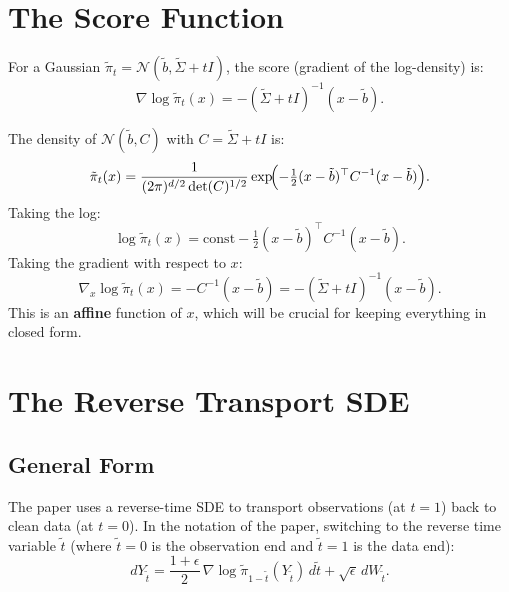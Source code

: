 \documentclass[11pt, a4paper]{article}
\theoremstyle{definition}
\begin{document}
\section{The Score Function}

For a Gaussian $\tilde{\pi}_t = \mathcal{N}(\tilde{b}, \tilde{\Sigma} + tI)$, the score (gradient of the log-density) is:
\[
    \nabla \log \tilde{\pi}_t(x) = -(\tilde{\Sigma} + tI)^{-1}(x - \tilde{b}).
\]

\begin{calculation}[title={Deriving the Gaussian score}]
The density of $\mathcal{N}(\tilde{b}, C)$ with $C = \tilde{\Sigma}+tI$ is:
\[
    \tilde{\pi}_t(x) = \frac{1}{(2\pi)^{d/2}\det(C)^{1/2}} \exp\!\Bigl(-\tfrac{1}{2}(x-\tilde{b})^\top C^{-1}(x-\tilde{b})\Bigr).
\]
Taking the log:
\[
    \log \tilde{\pi}_t(x) = \text{const} - \tfrac{1}{2}(x-\tilde{b})^\top C^{-1}(x-\tilde{b}).
\]
Taking the gradient with respect to $x$:
\[
    \nabla_x \log \tilde{\pi}_t(x) = -C^{-1}(x-\tilde{b}) = -(\tilde{\Sigma}+tI)^{-1}(x-\tilde{b}).
\]
This is an \textbf{affine} function of $x$, which will be crucial for keeping everything in closed form.
\end{calculation}

\section{The Reverse Transport SDE}

\subsection{General Form}

The paper uses a reverse-time SDE to transport observations (at $t=1$) back to clean data (at $t=0$). In the notation of the paper, switching to the reverse time variable $\tilde{t}$ (where $\tilde{t}=0$ is the observation end and $\tilde{t}=1$ is the data end):
\[
    dY_{\tilde{t}} = \frac{1+\epsilon}{2}\,\nabla\log\tilde{\pi}_{1-\tilde{t}}(Y_{\tilde{t}})\,d\tilde{t} + \sqrt{\epsilon}\,dW_{\tilde{t}}.
\]
\end{document}
